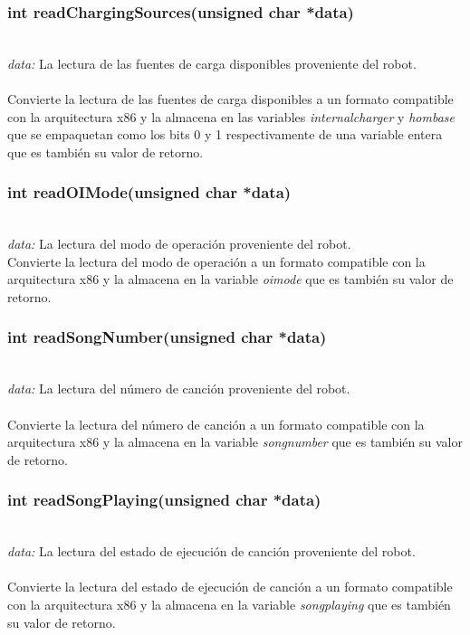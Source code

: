 \documentclass[letterpaper]{book}
\begin{document}
\subsubsection{int readChargingSources(unsigned char *data)}\mbox{}\\
\emph{data: }La lectura de las fuentes de carga disponibles proveniente del robot.\\\\
Convierte la lectura de las fuentes de carga disponibles a un formato compatible con la arquitectura x86 y la almacena en las variables \emph{internalcharger} y \emph{hombase} que se empaquetan como los bits 0 y 1 respectivamente de una variable entera que es también su valor de retorno.\\ 

\subsubsection{int readOIMode(unsigned char *data)}\mbox{}\\
\emph{data: }La lectura del modo de operación proveniente del robot.\\
Convierte la lectura del modo de operación a un formato compatible con la arquitectura x86 y la almacena en la variable \emph{oimode} que es también su valor de retorno.\\ 

\subsubsection{int readSongNumber(unsigned char *data)}\mbox{}\\
\emph{data: }La lectura del número de canción proveniente del robot.\\\\
Convierte la lectura del número de canción a un formato compatible con la arquitectura x86 y la almacena en la variable \emph{songnumber} que es también su valor de retorno.\\ 

\subsubsection{int readSongPlaying(unsigned char *data)}\mbox{}\\
\emph{data: }La lectura del estado de ejecución de canción proveniente del robot.\\\\
Convierte la lectura del estado de ejecución de canción a un formato compatible con la arquitectura x86 y la almacena en la variable \emph{songplaying} que es también su valor de retorno.\\ 
\end{document}
